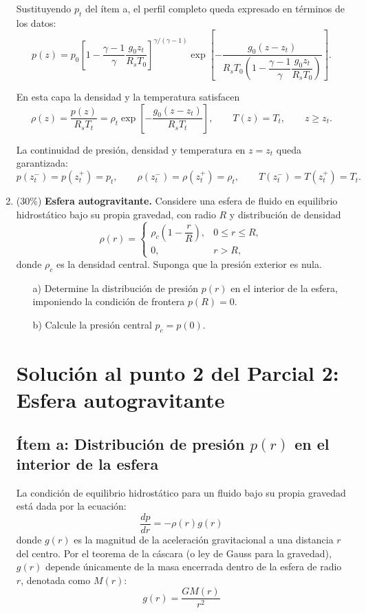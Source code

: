 \documentclass[12pt]{article}
\begin{document}
\begin{enumerate}
Sustituyendo $p_{t}$ del ítem a, el perfil completo queda expresado en términos de los datos:
$$p(z)=p_{0}\left[1-\frac{\gamma-1}{\gamma}\frac{g_{0}z_{t}}{R_{s}T_{0}}\right]^{\gamma/(\gamma-1)}
\exp\left[-\frac{g_{0}(z-z_{t})}{R_{s}T_{0}\left(1-\dfrac{\gamma-1}{\gamma}\dfrac{g_{0}z_{t}}{R_{s}T_{0}}\right)}\right].$$

En esta capa la densidad y la temperatura satisfacen
$$\rho(z)=\frac{p(z)}{R_{s}T_{t}}
=\rho_{t}\exp\left[-\frac{g_{0}(z-z_{t})}{R_{s}T_{t}}\right],
\qquad T(z)=T_{t},\qquad z\ge z_{t}.$$

La continuidad de presión, densidad y temperatura en $z=z_{t}$ queda garantizada:
$$p(z_{t}^{-})=p(z_{t}^{+})=p_{t},\qquad
\rho(z_{t}^{-})=\rho(z_{t}^{+})=\rho_{t},\qquad
T(z_{t}^{-})=T(z_{t}^{+})=T_{t}.$$



    \item (30\%) \textbf{Esfera autogravitante.} Considere una esfera de fluido en equilibrio hidrostático bajo su propia gravedad, con radio $R$ y distribución de densidad
    \[
    \rho(r) =
    \begin{cases}
        \rho_c\left(1 - \dfrac{r}{R}\right), & 0 \le r \le R,\\
        0, & r > R,
    \end{cases}
    \]
    donde $\rho_c$ es la densidad central. Suponga que la presión exterior es nula.
    \begin{itemize}
        \item[a)] Determine la distribución de presión $p(r)$ en el interior de la esfera, imponiendo la condición de frontera $p(R) = 0$.
        \item[b)] Calcule la presión central $p_c = p(0)$.
    \end{itemize}

\section{Solución al punto 2 del Parcial 2: Esfera autogravitante}

\subsection{Ítem a: Distribución de presión $p(r)$ en el interior de la esfera}

La condición de equilibrio hidrostático para un fluido bajo su propia gravedad está dada por la ecuación:
$$
\frac{dp}{dr} = -\rho(r) g(r)
$$
donde $g(r)$ es la magnitud de la aceleración gravitacional a una distancia $r$ del centro. Por el teorema de la cáscara (o ley de Gauss para la gravedad), $g(r)$ depende únicamente de la masa encerrada dentro de la esfera de radio $r$, denotada como $M(r)$:
$$
g(r) = \frac{G M(r)}{r^2}
$$


\end{enumerate}
\end{document}
